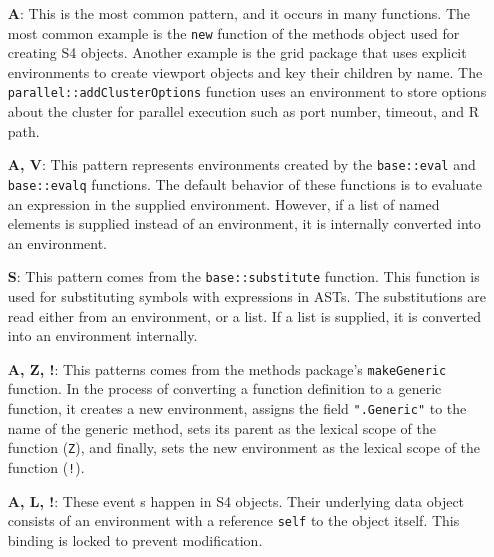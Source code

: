 \documentclass[10pt,review,sigplan,anonymous=true,authorversion=true,nonacm=true]{acmart}
\newcommand{\code}[1]{\lstinline |#1|\xspace}
\newcommand{\ie}{\emph{i.e.},\xspace}
\begin{document}
\begin{itemize}
\item[\textbf{A}:] This is the most common pattern, and it occurs in many
  functions. The most common example is the \code{new} function of the methods
  object used for creating S4 objects. Another example is the grid package that
  uses explicit environments to create viewport objects and key their children
  by name. The \code{parallel::addClusterOptions} function uses an environment
  to store options about the cluster for parallel execution such as port number,
  timeout, and R path.
\item[\textbf{A, V}:] This pattern represents environments created by the
  \code{base::eval} and \code{base::evalq} functions. The default behavior of
  these functions is to evaluate an expression in the supplied environment.
  However, if a list of named elements is supplied instead of an environment, it
  is internally converted into an environment.
\item[\textbf{S}:] This pattern comes from the \code{base::substitute} function.
  This function is used for substituting symbols with expressions in ASTs. The
  substitutions are read either from an environment, or a list. If a list is
  supplied, it is converted into an environment internally.
\item[\textbf{A, Z, !}:] This patterns comes from the methods package's
  \code{makeGeneric} function. In the process of converting a function
  definition to a generic function, it creates a new environment, assigns the
  field \code{".Generic"} to the name of the generic method, sets its parent as
  the lexical scope of the function (\texttt{Z}), and finally, sets the new
  environment as the lexical scope of the function (\texttt{!}).
\item[\textbf{A, L, !}:] These event s happen in S4 objects. Their underlying
  data object consists of an environment with a reference \code{self} to the
  object itself. This binding is locked to prevent modification.
\end{itemize}
\end{document}
